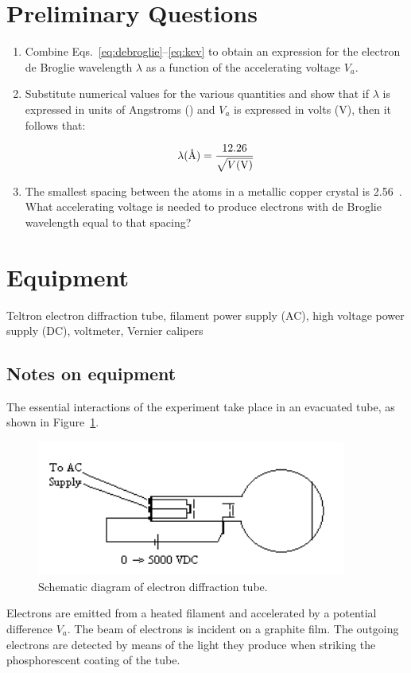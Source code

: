 \section{Preliminary Questions}
\begin{enumerate}
\item Combine Eqs.~\ref{eq:debroglie}--\ref{eq:kev} to obtain an expression for
  the electron de Broglie wavelength ${\lambda}$ as a function of the
  accelerating voltage $V_a$.

\item Substitute numerical values for the various quantities and show that if
  $\lambda$ is expressed in units of Angstroms (\angstrom) and $V_a$ is
  expressed in volts (V), then it follows that:

\begin{equation}
\lambda(\text{\normalfont\AA}) = {12.26 \over \sqrt{V({\rm V})} }
\end{equation}

\item The smallest spacing between the atoms in a metallic copper crystal is
  2.56~\angstrom. What accelerating voltage is needed to produce electrons with
  de Broglie wavelength equal to that spacing?
\end{enumerate}

\section{Equipment}
Teltron electron diffraction tube, filament power supply (AC), high voltage power supply (DC), voltmeter, Vernier calipers

\subsection{Notes on equipment}

The essential interactions of the experiment take place in an evacuated
tube, as shown in Figure~\ref{fig:schematic}. 
\begin{figure}
\begin{centering}
  \includegraphics[width=4in]{../images/ediffraction-img1.png}
\caption{Schematic diagram of electron diffraction tube.}
\label{fig:schematic}
\end{centering}
\end{figure}
Electrons are emitted from a heated filament and accelerated by a potential
difference $V_a$.  The beam of electrons is incident on a graphite film.  The
outgoing electrons are detected by means of the light they produce when striking
the phosphorescent coating of the tube.

